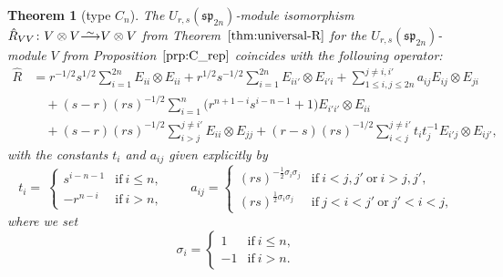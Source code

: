 \documentclass[10pt,a4paper]{amsart}
\numberwithin{equation}{section}
\newtheorem{Theorem}{Theorem}[section]
\newcommand{\ssp}{\mathfrak{sp}}
\newcommand\iso{ \vphantom{j^{X^2}}\smash{\overset{\sim}{\vphantom{\rule{0pt}{0.20em}}\smash{\longrightarrow}}} }
\begin{document}
\begin{Theorem}[type $C_{n}$]\label{thm:C_RMatrix}
The $U_{r,s}(\ssp_{2n})$-module isomorphism $\hat{R}_{VV}\colon V \otimes V \iso V \otimes V$ from Theorem~$\ref{thm:universal-R}$ for the $U_{r,s}(\ssp_{2n})$-module $V$ from Proposition~$\ref{prp:C_rep}$ coincides with the following operator:
\begin{align}
 \hat{R} &{}=
 r^{-1/2}s^{1/2}\sum_{i = 1}^{2n} E_{ii} \otimes E_{ii} +
 r^{1/2}s^{-1/2}\sum_{i = 1}^{2n} E_{ii'} \otimes E_{i'i}+ \sum_{1\leq i,j\leq 2n}^{j \ne i,i'} a_{ij}E_{ij} \otimes E_{ji} \nonumber\\
 &\quad{}
 + (s - r)(rs)^{-1/2}\sum_{i = 1}^{n} \bigl(r^{n+ 1 - i}s^{i - n - 1} + 1\bigr)E_{i'i'} \otimes E_{ii} \nonumber\\
 &\quad{} + (s - r)(rs)^{-1/2}\sum_{i > j}^{j \neq i'} E_{ii} \otimes E_{jj}
 + (r - s)(rs)^{-1/2}\sum_{i < j}^{j \neq i'} t_{i}t_{j}^{-1}E_{i'j} \otimes E_{ij'} ,\label{eq:C_RMatrix}
\end{align}
with the constants $t_i$ and $a_{ij}$ given explicitly by
\begin{equation}\label{eq:C_coeffs}
 t_{i} = \
 \begin{cases}
 s^{i - n - 1} & \text{if}\ i \le n, \\
 -r^{n - i} & \text{if}\ i > n,
 \end{cases} \qquad
 a_{ij} =
 \begin{cases}
 (rs)^{-\frac{1}{2}\sigma_{i}\sigma_{j}} & \text{if}\ i < j,j'\ \text{or}\ i > j,j', \\
 (rs)^{\frac{1}{2}\sigma_{i}\sigma_{j}} & \text{if}\ j < i < j'\ \text{or}\ j' < i < j,
 \end{cases}
\end{equation}
where we set
\begin{displaymath}
 \sigma_{i} =
 \begin{cases}
 1 & \text{if}\ i \le n, \\
 -1 & \text{if}\ i > n.
 \end{cases}
\end{displaymath}
\end{Theorem}
\end{document}
